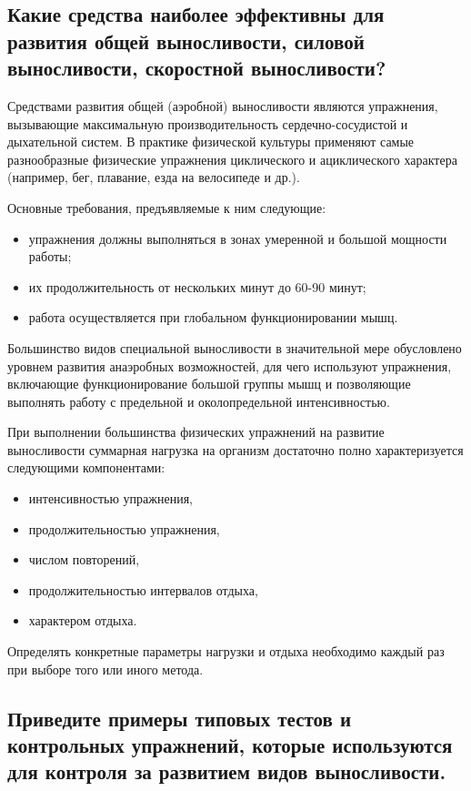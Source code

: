 \subsection{Какие средства наиболее эффективны для развития общей выносливости, силовой выносливости, скоростной выносливости?}

Средствами развития общей (аэробной) выносливости являются упражнения, вызывающие максимальную производительность
сердечно-сосудистой и дыхательной систем. В практике физической культуры применяют самые разнообразные физические упражнения
циклического и ациклического характера (например, бег, плавание, езда на велосипеде и др.).

Основные требования, предъявляемые к ним следующие:
\begin{itemize}
    \item упражнения должны выполняться в зонах умеренной и большой мощности работы;
    \item их продолжительность от нескольких минут до 60-90 минут;
    \item работа осуществляется при глобальном функционировании мышц.
\end{itemize}

Большинство видов специальной выносливости в значительной мере обусловлено уровнем развития анаэробных возможностей,
для чего используют упражнения, включающие функционирование большой группы мышц и позволяющие выполнять работу с
предельной и околопредельной интенсивностью.

При выполнении большинства физических упражнений на развитие выносливости суммарная нагрузка на организм достаточно
полно характеризуется следующими компонентами:
\begin{itemize}
    \item интенсивностью упражнения,
    \item продолжительностью упражнения,
    \item числом повторений,
    \item продолжительностью интервалов отдыха,
    \item характером отдыха.
\end{itemize}

Определять конкретные параметры нагрузки и отдыха необходимо каждый раз при выборе того или иного метода.


\subsection{Приведите примеры типовых тестов и контрольных упражнений, которые используются для контроля за развитием видов выносливости.}

